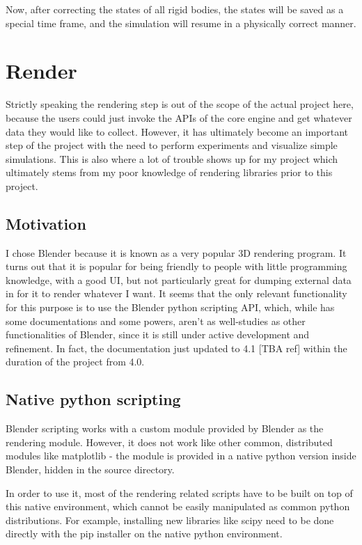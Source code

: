 \documentclass[12pt,a4paper,twoside,openright]{report}
\begin{document}
Now, after correcting the states of all rigid bodies, the states will be saved as a special time frame, and the simulation will resume in a physically correct manner.

\section{Render}

Strictly speaking the rendering step is out of the scope of the actual project here, because the users could just invoke the APIs of the core engine and get whatever data they would like to collect. However, it has ultimately become an important step of the project with the need to perform experiments and visualize simple simulations. This is also where a lot of trouble shows up for my project which ultimately stems from my poor knowledge of rendering libraries prior to this project.

\subsection{Motivation}

I chose Blender because it is known as a very popular 3D rendering program. It turns out that it is popular for being friendly to people with little programming knowledge, with a good UI, but not particularly great for dumping external data in for it to render whatever I want. It seems that the only relevant functionality for this purpose is to use the Blender python scripting API, which, while has some documentations and some powers, aren't as well-studies as other functionalities of Blender, since it is still under active development and refinement. In fact, the documentation just updated to 4.1 [TBA ref] within the duration of the project from 4.0.

\subsection{Native python scripting}

Blender scripting works with a custom module provided by Blender as the rendering module. However, it does not work like other common, distributed modules like matplotlib - the module is provided in a native python version inside Blender, hidden in the source directory.

In order to use it, most of the rendering related scripts have to be built on top of this native environment, which cannot be easily manipulated as common python distributions. For example, installing new libraries like scipy need to be done directly with the pip installer on the native python environment.
\end{document}
